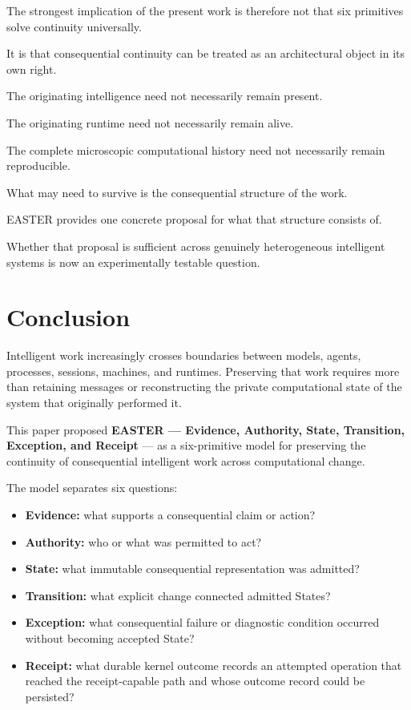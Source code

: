 \documentclass[11pt]{article}
\begin{document}
The strongest implication of the present work is therefore not that six primitives solve continuity universally.

It is that consequential continuity can be treated as an architectural object in its own right.

The originating intelligence need not necessarily remain present.

The originating runtime need not necessarily remain alive.

The complete microscopic computational history need not necessarily remain reproducible.

What may need to survive is the consequential structure of the work.

EASTER provides one concrete proposal for what that structure consists of.

Whether that proposal is sufficient across genuinely heterogeneous intelligent systems is now an experimentally testable question.

\section{Conclusion}

Intelligent work increasingly crosses boundaries between models, agents, processes, sessions, machines, and runtimes. Preserving that work requires more than retaining messages or reconstructing the private computational state of the system that originally performed it.

This paper proposed \textbf{EASTER --- Evidence, Authority, State, Transition, Exception, and Receipt} --- as a six-primitive model for preserving the continuity of consequential intelligent work across computational change.

The model separates six questions:

\begin{itemize}
\item \textbf{Evidence:} what supports a consequential claim or action?
\item \textbf{Authority:} who or what was permitted to act?
\item \textbf{State:} what immutable consequential representation was admitted?
\item \textbf{Transition:} what explicit change connected admitted States?
\item \textbf{Exception:} what consequential failure or diagnostic condition occurred without becoming accepted State?
\item \textbf{Receipt:} what durable kernel outcome records an attempted operation that reached the receipt-capable path and whose outcome record could be persisted?
\end{itemize}
\end{document}
